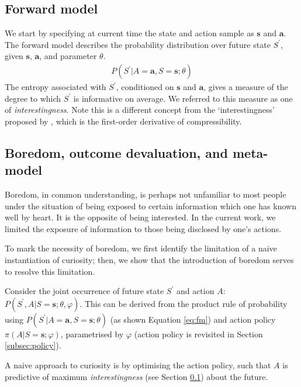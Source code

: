 \documentclass[utf8]{frontiersSCNS}
\newcommand{\bs}{\boldsymbol}
\begin{document}
\subsection{Forward model} \label{subsec:fm}

We start by specifying at current time the state and action sample as $\bs{s}$ and $\bs{a}$. The forward model describes the probability distribution over future state $S^\prime$, given $\bs{s}$, $\bs{a}$, and parameter $\theta$.
%
	\begin{equation}
	\begin{aligned} \label{eq:fm}
	P(S^\prime | A=\bs{a}, S=\bs{s}; \theta)
	\end{aligned}
	\end{equation}
%
The entropy associated with $S^\prime$, conditioned on $\bs{s}$ and $\bs{a}$, gives a measure of the degree to which $S^\prime$ is informative on average. We referred to this measure as one of {\it interestingness}. Note this is a different concept from the `interestingness' proposed by \citet{schmidhuber2008driven}, which is the first-order derivative of compressibility.

\subsection{Boredom, outcome devaluation, and meta-model} \label{subsec:boredom}

Boredom, in common understanding, is perhaps not unfamiliar to most people under the situation of being exposed to certain information which one has known well by heart. It is the opposite of being interested. In the current work, we limited the exposure of information to those being disclosed by one's actions.

To mark the necessity of boredom, we first identify the limitation of a naive instantiation of curiosity; then, we show that the introduction of boredom serves to resolve this limitation.

Consider the joint occurrence of future state $S^\prime$ and action $A$: $ P (S^\prime, A|S=\bs{s}; \theta, \varphi)$.  This can be derived from the product rule of probability using $P(S^\prime|A=\bs{a}, S=\bs{s}; \theta)$ (as shown Equation \ref{eq:fm}) and action policy $\pi(A|S=\bs{s}; \varphi)$, parametrised by $\varphi$ (action policy is revisited in Section \ref{subsec:policy}). 

A naive approach to curiosity is by optimising the action policy, such that $A$ is predictive of maximum {\it interestingness} (see Section \ref{subsec:fm}) about the future.
\end{document}
